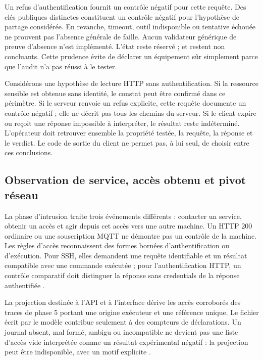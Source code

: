\documentclass[11pt,a4paper]{article}
\DeclareRobustCommand{\code}[1]{{\small\path{#1}}}
\begin{document}
Un refus d'authentification fournit un contrôle négatif pour cette requête.
Des clés publiques distinctes constituent un contrôle négatif pour
l'hypothèse de partage considérée. En revanche, timeout, outil indisponible
ou tentative échouée ne prouvent pas l'absence générale de faille. Aucun
validateur générique de preuve d'absence n'est implémenté. L'état
\code{refuted} reste réservé ; \code{FAILED} et \code{NOT_EXPLOITABLE}
restent non concluants. Cette prudence évite de déclarer un équipement sûr
simplement parce que l'audit n'a pas réussi à le tester.

Considérons une hypothèse de lecture HTTP sans authentification. Si la
ressource sensible est obtenue sans identité, le constat peut être confirmé
dans ce périmètre. Si le serveur renvoie un refus explicite, cette requête
documente un contrôle négatif ; elle ne décrit pas tous les chemins du serveur.
Si le client expire ou reçoit une réponse impossible à interpréter, le résultat
reste indéterminé. L'opérateur doit retrouver ensemble la propriété testée,
la requête, la réponse et le verdict. Le code de sortie du client ne permet
pas, à lui seul, de choisir entre ces conclusions.

\subsection{Observation de service, accès obtenu et pivot réseau}

La phase d'intrusion traite trois événements différents : contacter un
service, obtenir un accès et agir depuis cet accès vers une autre machine.
Un HTTP 200 ordinaire ou une souscription MQTT ne démontre pas un contrôle
de la machine. Les règles d'accès reconnaissent des formes bornées
d'authentification ou d'exécution. Pour SSH, elles demandent une requête
identifiable et un résultat compatible avec une commande exécutée ; pour
l'authentification HTTP, un contrôle comparatif doit distinguer la réponse
sans credentials de la réponse authentifiée \cite{sec-acces}.

La projection destinée à l'API et à l'interface dérive les accès corroborés
des traces de phase 5 portant une origine exécuteur et une référence unique.
Le fichier écrit par le modèle contribue seulement à des compteurs de
déclarations. Un journal absent, mal formé, ambigu ou incompatible ne devient
pas une liste d'accès vide interprétée comme un résultat expérimental
négatif : la projection peut être indisponible, avec un motif explicite
\cite{sec-intrusion}.
\end{document}
